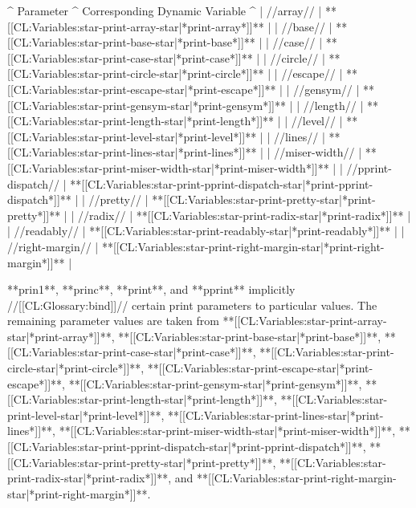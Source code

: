 ^ Parameter           ^ Corresponding Dynamic Variable                                               ^
| //array//           | **[[CL:Variables:star-print-array-star|*print-array*]]**                     |
| //base//            | **[[CL:Variables:star-print-base-star|*print-base*]]**                       |
| //case//            | **[[CL:Variables:star-print-case-star|*print-case*]]**                       |
| //circle//          | **[[CL:Variables:star-print-circle-star|*print-circle*]]**                   |
| //escape//          | **[[CL:Variables:star-print-escape-star|*print-escape*]]**                   |
| //gensym//          | **[[CL:Variables:star-print-gensym-star|*print-gensym*]]**                   |
| //length//          | **[[CL:Variables:star-print-length-star|*print-length*]]**                   |
| //level//           | **[[CL:Variables:star-print-level-star|*print-level*]]**                     |
| //lines//           | **[[CL:Variables:star-print-lines-star|*print-lines*]]**                     |
| //miser-width//     | **[[CL:Variables:star-print-miser-width-star|*print-miser-width*]]**         |
| //pprint-dispatch// | **[[CL:Variables:star-print-pprint-dispatch-star|*print-pprint-dispatch*]]** |
| //pretty//          | **[[CL:Variables:star-print-pretty-star|*print-pretty*]]**                   |
| //radix//           | **[[CL:Variables:star-print-radix-star|*print-radix*]]**                     |
| //readably//        | **[[CL:Variables:star-print-readably-star|*print-readably*]]**               |
| //right-margin//    | **[[CL:Variables:star-print-right-margin-star|*print-right-margin*]]**       |

**prin1**, **princ**, **print**, and **pprint** implicitly //[[CL:Glossary:bind]]// certain print parameters to particular values. The remaining parameter values are taken from **[[CL:Variables:star-print-array-star|*print-array*]]**, **[[CL:Variables:star-print-base-star|*print-base*]]**, **[[CL:Variables:star-print-case-star|*print-case*]]**, **[[CL:Variables:star-print-circle-star|*print-circle*]]**, **[[CL:Variables:star-print-escape-star|*print-escape*]]**, **[[CL:Variables:star-print-gensym-star|*print-gensym*]]**, **[[CL:Variables:star-print-length-star|*print-length*]]**, **[[CL:Variables:star-print-level-star|*print-level*]]**, **[[CL:Variables:star-print-lines-star|*print-lines*]]**, **[[CL:Variables:star-print-miser-width-star|*print-miser-width*]]**, **[[CL:Variables:star-print-pprint-dispatch-star|*print-pprint-dispatch*]]**, **[[CL:Variables:star-print-pretty-star|*print-pretty*]]**, **[[CL:Variables:star-print-radix-star|*print-radix*]]**, and **[[CL:Variables:star-print-right-margin-star|*print-right-margin*]]**.


